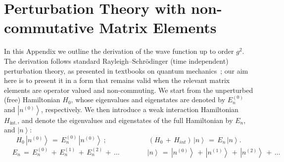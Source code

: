 \documentclass[a4paper,11pt]{article}
\begin{document}
  \section{Perturbation Theory with non-commutative Matrix Elements} \label{sec:App5}
In this Appendix we outline the derivation of the wave function up to
order $g^2$. The derivation follows standard Rayleigh--Schr\"odinger
(time independent) perturbation theory, as presented in textbooks on
quantum mechanics~\cite{Landau:1991wop,shankar2012principles}; our aim here is to present it in a form that remains valid when the relevant matrix elements are operator valued and non-commuting. We start from the unperturbed (free) Hamiltonian $H_{0}$, whose eigenvalues and eigenstates are denoted by $E_{n}^{(0)}$ and $\left|n^{(0)}\right\rangle $, respectively. We then introduce a weak interaction Hamiltonian $H_{\text{int.}}$, and denote the eigenvalues and eigenstates of the full Hamiltonian by $E_{n}$, and $\left|n\right\rangle$:
\begin{equation}\label{dwf1}
H_{0}\,\left|n^{(0)}\right\rangle \,=\, E_{n}^{(0)}\,\left|n^{(0)}\right\rangle \:;\qquad\qquad\qquad\left(H_{0}\,+\, H_{int}\right)\,\left|n\right\rangle \,=\, E_{n}\,\left|n\right\rangle .
  \end{equation}
  \begin{equation}\begin{split}\label{poas}
  &E_{n}\,=\, E_{n}^{(0)}\,+\, E_{n}^{(1)}\,+\, E_{n}^{(2)}\,+\,\ldots\qquad\qquad\left|n\right\rangle \,=\,\left|n^{(0)}\right\rangle \,+\,\left|n^{(1)}\right\rangle \,+\,\left|n^{(2)}\right\rangle \,+\,\ldots
 \end{split}\end{equation}
\end{document}
